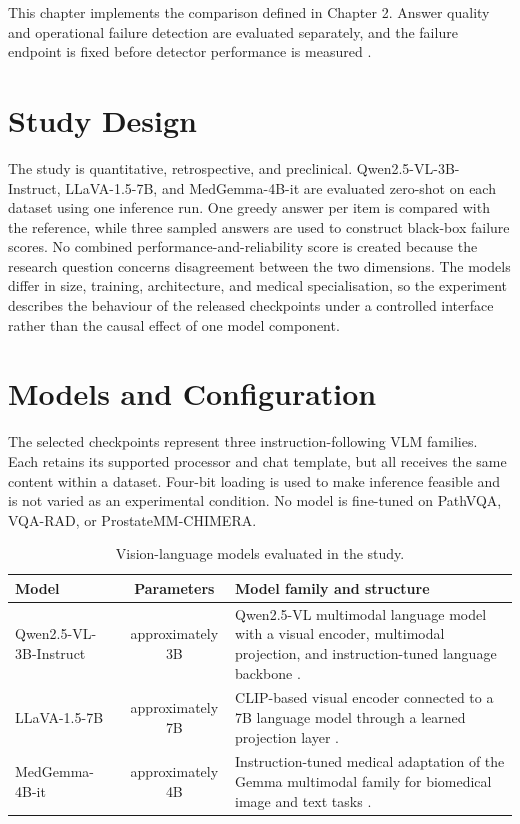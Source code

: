 This chapter implements the comparison defined in Chapter 2. Answer quality and operational failure detection are evaluated separately, and the failure endpoint is fixed before detector performance is measured \citep{carlini2026qasnne}.

\section{Study Design}

The study is quantitative, retrospective, and preclinical. Qwen2.5-VL-3B-Instruct, LLaVA-1.5-7B, and MedGemma-4B-it are evaluated zero-shot on each dataset using one inference run. One greedy answer per item is compared with the reference, while three sampled answers are used to construct black-box failure scores. No combined performance-and-reliability score is created because the research question concerns disagreement between the two dimensions. The models differ in size, training, architecture, and medical specialisation, so the experiment describes the behaviour of the released checkpoints under a controlled interface rather than the causal effect of one model component.

\section{Models and Configuration}

The selected checkpoints represent three instruction-following VLM families. Each retains its supported processor and chat template, but all receives the same content within a dataset. Four-bit loading is used to make inference feasible and is not varied as an experimental condition. No model is fine-tuned on PathVQA, VQA-RAD, or ProstateMM-CHIMERA.

\begin{table}[htbp]
    \centering
    \caption{Vision-language models evaluated in the study.}
    \label{tab:model-configurations}
    \small
    \begin{tabularx}{\textwidth}{>{\raggedright\arraybackslash}p{3.1cm}cX}
        \toprule
        Model & Parameters & Model family and structure \\
        \midrule
        Qwen2.5-VL-3B-Instruct & approximately 3B & Qwen2.5-VL multimodal language model with a visual encoder, multimodal projection, and instruction-tuned language backbone \citep{bai2023qwenvl}. \\
        LLaVA-1.5-7B & approximately 7B & CLIP-based visual encoder connected to a 7B language model through a learned projection layer \citep{liu2023visualinstruction}. \\
        MedGemma-4B-it & approximately 4B & Instruction-tuned medical adaptation of the Gemma multimodal family for biomedical image and text tasks \citep{sellergren2025medgemma}. \\
        \bottomrule
    \end{tabularx}
\end{table}


